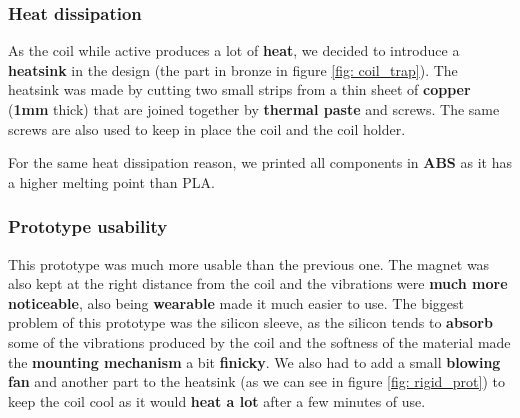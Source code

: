 \begin{itemize}
\end{itemize}

\subsubsection{Heat dissipation}
As the coil while active produces a lot of \textbf{heat}, we decided to introduce a \textbf{heatsink} in the design (the part in bronze in figure \ref{fig: coil_trap}).
The heatsink was made by cutting two small strips from a thin sheet of \textbf{copper} (\textbf{1mm} thick) that are joined together by \textbf{thermal paste} and screws.
The same screws are also used to keep in place the coil and the coil holder.

For the same heat dissipation reason, we printed all components in \textbf{ABS} as it has a higher melting point than PLA.

\subsubsection{Prototype usability}
This prototype was much more usable than the previous one.
The magnet was also kept at the right distance from the coil and the vibrations were \textbf{much more noticeable}, also being \textbf{wearable} made it much easier to use.
The biggest problem of this prototype was the silicon sleeve, as the silicon tends to \textbf{absorb} some of the vibrations produced by the coil and the softness of the material made the \textbf{mounting mechanism} a bit \textbf{finicky}.
We also had to add a small \textbf{blowing fan} and another part to the heatsink (as we can see in figure \ref{fig: rigid_prot}) to keep the coil cool as it would \textbf{heat a lot} after a few minutes of use.

